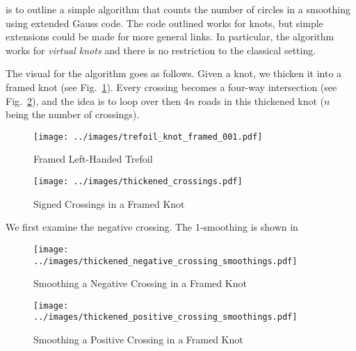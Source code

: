 \documentclass{article}
\theoremstyle{plain}
\begin{document}
        is to outline a simple algorithm that counts the number of circles in a
        smoothing using extended Gauss code. The code outlined works for knots,
        but simple extensions could be made for more general links. In
        particular, the algorithm works for \textit{virtual knots} and there is
        no restriction to the classical setting.
        \par\hfill\par
        The visual for the algorithm goes as follows. Given a knot, we thicken
        it into a framed knot (see Fig.~\ref{fig:trefoil_knot_framed_001}).
        Every crossing becomes a four-way intersection
        (see Fig.~\ref{fig:thickened_crossings}), and the idea is to loop
        over then $4n$ roads in this thickened knot ($n$ being the number of
        crossings).
        \begin{figure}
            \centering
            \texttt{[image: ../images/trefoil\_knot\_framed\_001.pdf]}
            \caption{Framed Left-Handed Trefoil}
            \label{fig:trefoil_knot_framed_001}
        \end{figure}
        \begin{figure}
            \centering
            \texttt{[image: ../images/thickened\_crossings.pdf]}
            \caption{Signed Crossings in a Framed Knot}
            \label{fig:thickened_crossings}
        \end{figure}
        We first examine the negative crossing. The 1-smoothing is shown in
        \begin{figure}
            \centering
            \texttt{[image: ../images/thickened\_negative\_crossing\_smoothings.pdf]}
            \caption{Smoothing a Negative Crossing in a Framed Knot}
            \label{fig:thickened_negative_crossing_smoothings}
        \end{figure}
        \begin{figure}
            \centering
            \texttt{[image: ../images/thickened\_positive\_crossing\_smoothings.pdf]}
            \caption{Smoothing a Positive Crossing in a Framed Knot}
            \label{fig:thickened_positive_crossing_smoothings}
        \end{figure}
\end{document}
